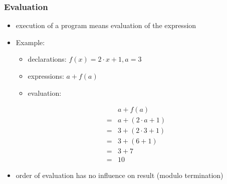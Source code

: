 \begin{multicols}{2}
\subsubsection{Evaluation}
\begin{itemize}
  \item execution of a program means evaluation of the expression
  \item Example:
  \begin{itemize}
    \item declarations: $f(x) = 2 \cdot x + 1, a = 3$
    \item expressions: $a + f(a)$
    \item evaluation:
  \end{itemize}
  \begin{align*}
    &a + f(a)\\
    =&a + (2 \cdot a + 1)\\
    =&3 + (2 \cdot 3 + 1)\\
    =&3 + (6 + 1)\\
    =&3 + 7\\
    =&10
  \end{align*}
  \item order of evaluation has no influence on result (modulo termination)
\end{itemize}


\end{multicols}

